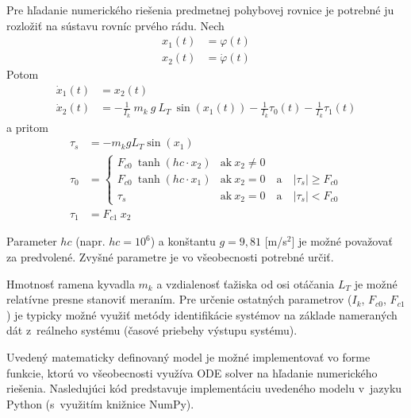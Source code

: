 \documentclass[a4paper, 10pt, ]{article}
\begin{document}
Pre hľadanie numerického riešenia predmetnej pohybovej rovnice je potrebné ju rozložiť na sústavu rovníc prvého rádu. Nech
\begin{subequations}
\begin{align}
    x_1(t) &= \varphi(t) \\
    x_2(t) &= \dot \varphi(t)
\end{align}
\end{subequations}
Potom
\begin{subequations}
\begin{align}
    \dot x_1(t) &= x_2(t) \\
    \dot x_2(t) &= - \frac{1}{I_k}\ m_k \  g \   L_T\  \sin(x_1(t)) - \frac{1}{I_k} \tau_0(t) - \frac{1}{I_k} \tau_1(t)
\end{align}
\end{subequations}
a pritom
\begin{subequations}
\begin{align}
    \tau_s &= - m_k g L_T \sin(x_1) \\
    \tau_0 &= 
    \begin{cases} 
        F_{c0} \ \tanh(hc\cdot x_2) & \text{ak}   \ x_2 \neq 0  \\
        F_{c0} \ \tanh(hc\cdot      x_1) & \text{ak}   \ x_2 = 0 \quad \text{a} \quad \left|\tau_s\right| \geq F_{c0} \\
        \tau_s &  \text{ak}  \ x_2 = 0 \quad \text{a} \quad \left|\tau_s\right| < F_{c0}
    \end{cases}  \\
    \tau_1 &= F_{c1} \ x_2
\end{align}
\end{subequations}

Parameter $hc$ (napr. $hc = 10^6$) a konštantu $g = 9,81$ [m/s\(^2\)] je možné považovať za predvolené. Zvyšné parametre je vo všeobecnosti potrebné určiť.

Hmotnosť ramena kyvadla $m_k$ a vzdialenosť ťažiska od osi otáčania $L_T$ je možné relatívne presne stanoviť meraním. Pre určenie ostatných parametrov ($I_k$, $F_{c0}$, $F_{c1}$) je typicky možné využiť metódy identifikácie systémov na základe nameraných dát z~reálneho systému (časové priebehy výstupu systému).

Uvedený matematicky definovaný model je možné implementovať vo forme funkcie, ktorú vo všeobecnosti využíva ODE solver na hľadanie numerického riešenia. Nasledujúci kód predstavuje implementáciu uvedeného modelu v~jazyku Python (s~využitím knižnice NumPy). 
\end{document}
